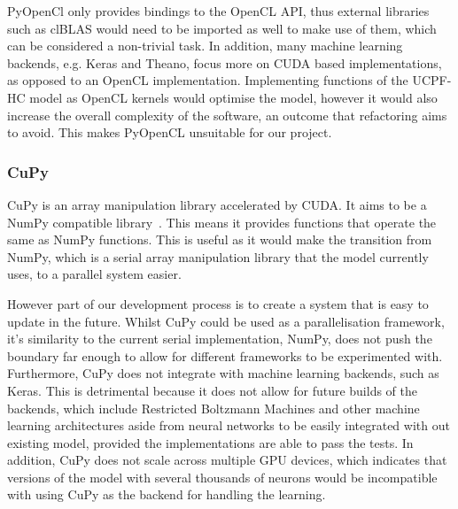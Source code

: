 PyOpenCl only provides bindings to the OpenCL API, thus external libraries such as clBLAS would need to be imported as well to make use of them, which can be considered a non-trivial task.
In addition, many machine learning backends, e.g. Keras and Theano, focus more on CUDA based implementations, as opposed to an OpenCL implementation.
Implementing functions of the UCPF-HC model as OpenCL kernels would optimise the model, however it would also increase the overall complexity of the software, an outcome that refactoring aims to avoid.
This makes PyOpenCL unsuitable for our project.




\subsubsection{CuPy}

CuPy is an array manipulation library accelerated by CUDA. 
It aims to be a NumPy compatible library~\citep{cupy_learningsys2017}. 
This means it provides functions that operate the same as NumPy functions.
This is useful as it would make the transition from NumPy, which is a serial array manipulation library that the model currently uses, to a parallel system easier.

However part of our development process is to create a system that is easy to update in the future.
Whilst CuPy could be used as a parallelisation framework, it's similarity to the current serial implementation, NumPy, does not push the boundary far enough to allow for different frameworks to be experimented with. 
Furthermore, CuPy does not integrate with machine learning backends, such as Keras.
This is detrimental because it does not allow for future builds of the backends, which include Restricted Boltzmann Machines and other machine learning architectures aside from neural networks to be easily integrated with out existing model, provided the implementations are able to pass the tests.
In addition, CuPy does not scale across multiple GPU devices, which indicates that versions of the model with several thousands of neurons would be incompatible with using CuPy as the backend for handling the learning.


